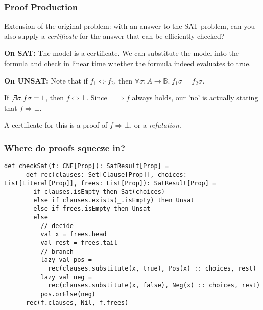 \documentclass[
  aspectratio=1610, 
  xcolor={dvipsnames},
]{beamer}
\begin{document}
\begin{frame}
  \frametitle{Proof Production}

  Extension of the original problem: with an answer to the SAT problem, can you
  also supply a \emph{certificate} for the answer that can be efficiently
  checked?

  \pause
  \textbf{On SAT:} \pause
  The model is a certificate. We can substitute the model into the formula
  and check in linear time whether the formula indeed evaluates to true.

  \pause
  \textbf{On UNSAT:} \pause
  Note that if \(f_1 \iff f_2\), then \(\forall \sigma: A \to \mathbb{B}.\;
  f_1\sigma = f_2\sigma\). 

  If \(\not\exists \sigma. f\sigma = 1\), then \(f \iff \bot\). Since \(\bot
  \Rightarrow f\) always holds, our 'no' is actually stating that \(f
  \Rightarrow \bot\).

  A certificate for this is a proof of \(f \Rightarrow \bot\), or a
  \emph{refutation}.

\end{frame}
\begin{frame}[fragile]
  \frametitle{Where do proofs squeeze in?}
  
  \begin{lstlisting}[basicstyle=\ttfamily\scriptsize]
    def checkSat(f: CNF[Prop]): SatResult[Prop] =
      def rec(clauses: Set[Clause[Prop]], choices: List[Literal[Prop]], frees: List[Prop]): SatResult[Prop] =
        if clauses.isEmpty then Sat(choices)
        else if clauses.exists(_.isEmpty) then Unsat
        else if frees.isEmpty then Unsat
        else
          // decide
          val x = frees.head
          val rest = frees.tail
          // branch
          lazy val pos = 
            rec(clauses.substitute(x, true), Pos(x) :: choices, rest)
          lazy val neg = 
            rec(clauses.substitute(x, false), Neg(x) :: choices, rest)
          pos.orElse(neg)
      rec(f.clauses, Nil, f.frees)
  \end{lstlisting}

\end{frame}
\end{document}
